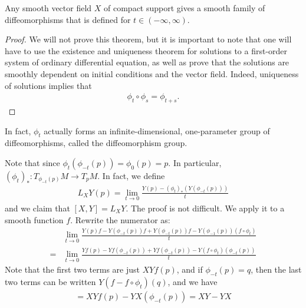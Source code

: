 \documentclass{../mathnotes}
\begin{document}
\begin{thm}
    Any smooth vector field $X$ of compact support gives a smooth family of diffeomorphisms that is defined for $t\in\left( -\infty,\infty \right)$.
\end{thm}
\begin{proof}
    We will not prove this theorem, but it is important to note that one will have to use the existence and uniqueness theorem
    for solutions to a first-order system of ordinary differential equation, as well as prove that the solutions are smoothly
    dependent on initial conditions and the vector field. Indeed, uniqueness of solutions implies that
    \begin{align*}
        \phi_t\circ\phi_s=\phi_{t+s}.
    \end{align*}
\end{proof}
In fact, $\phi_t$ actually forms an infinite-dimensional, one-parameter group of diffeomorphisms, called the diffeomorphism group.

Note that since $\phi_t(\phi_{-t}(p))=\phi_0(p)=p$. In particular, $(\phi_t)_*:T_{\phi_{-t}(p)}M\to T_pM$. In fact, we define
\begin{align*}
    L_XY(p)=\lim_{t\to 0}\frac{Y(p)-(\phi_t)_*(Y(\phi_{-t}(p)))}{t}
\end{align*}
and we claim that $[X,Y]=L_XY$. The proof is not difficult. We apply it to a smooth function $f$. Rewrite the numerator as:
\begin{align*}
    &\lim_{t\to0}\frac{Y(p)f-Y(\phi_{-t}(p))f+Y(\phi_{-t}(p))f-Y(\phi_{-1}(p))(f\circ\phi_t)}{t}\\
    =&\lim_{t\to 0}\frac{Yf(p)-Yf(\phi_{-t}(p))+Yf(\phi_{-t}(p))-Y(f\circ\phi_t)(\phi_{-t}(p))}{t}
\end{align*}
Note that the first two terms are just $XYf(p)$, and if $\phi_{-t}(p)=q$, then the last two terms can be written $Y(f-f\circ\phi_t)(q)$,
and we have
\begin{align*}
    =XYf(p)-YX(\phi_{-t}(p))=XY-YX
\end{align*}
\end{document}
